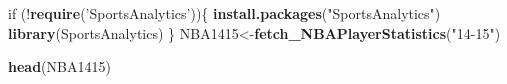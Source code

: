 \documentclass[]{book}
\newenvironment{Shaded}{\begin{snugshade}}{\end{snugshade}}
\newcommand{\KeywordTok}[1]{\textcolor[rgb]{0.13,0.29,0.53}{\textbf{{#1}}}}
\newcommand{\StringTok}[1]{\textcolor[rgb]{0.31,0.60,0.02}{{#1}}}
\newcommand{\NormalTok}[1]{{#1}}
\theoremstyle{definition}
\theoremstyle{definition}
\theoremstyle{remark}
\begin{document}
\begin{Shaded}
\begin{Highlighting}[]
\NormalTok{if (!}\KeywordTok{require}\NormalTok{(}\StringTok{'SportsAnalytics'}\NormalTok{))\{}
    \KeywordTok{install.packages}\NormalTok{(}\StringTok{"SportsAnalytics"}\NormalTok{)}
    \KeywordTok{library}\NormalTok{(SportsAnalytics)}
\NormalTok{\}}
\NormalTok{NBA1415<-}\KeywordTok{fetch_NBAPlayerStatistics}\NormalTok{(}\StringTok{"14-15"}\NormalTok{)}
\end{Highlighting}
\end{Shaded}

\begin{Shaded}
\begin{Highlighting}[]
\KeywordTok{head}\NormalTok{(NBA1415)}
\end{Highlighting}
\end{Shaded}
\end{document}
